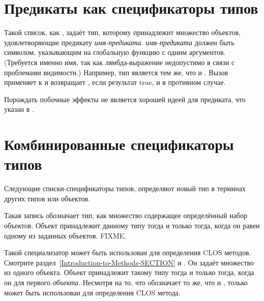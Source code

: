 \section{Предикаты как спецификаторы типов}
\label{PREDICATING-TYPE-SPECIFIERS-SECTION}

Такой список, как , задаёт тип, которому
принадлежит множество объектов, удовлетворяющие предикату
\emph{имя-предиката}. \emph{имя-предиката} должен быть символом, указывающим на 
глобальную функцию с одним аргументов.
(Требуется именно имя, так как лямбда-выражение недопустимо в связи с проблемами
видимости.) Например, тип  является тем же, что и
.
Вызов  применяет  к  и возвращает
, если результат true, и {\nil} в противном случае.

Порождать побочные эффекты не является хорошей идеей для предиката, что указан в
. 

\section{Комбинированные спецификаторы типов}

Следующие списки-спецификаторы типов, определяют новый тип в терминах других типов
или объектов.

\begin{flushdesc}
\item[\cd{(member \emph{object1} \emph{object2} ...)}]
  Такая запись обозначает тип, как множество содержащее определённый набор объектов. Объект
  принадлежит данному типу тогда и только тогда, когда он равен  одному из
  заданных объектов. FIXME.
\end{flushdesc}

\begin{flushdesc}
\item[\cd{(eql \emph{object})}]
  Такой специализатор может быть использован для определения CLOS
  методов. Смотрите раздел~\ref{Introduction-to-Methods-SECTION} и
  .
  Он задаёт множество из одного объекта. Объект принадлежит такому типу тогда и
  только тогда, когда он  для первого \emph{объекта}. Несмотря на то, что
   обозначает то же, что и ,
  только  может быть использован для определения CLOS метода.
\end{flushdesc}

